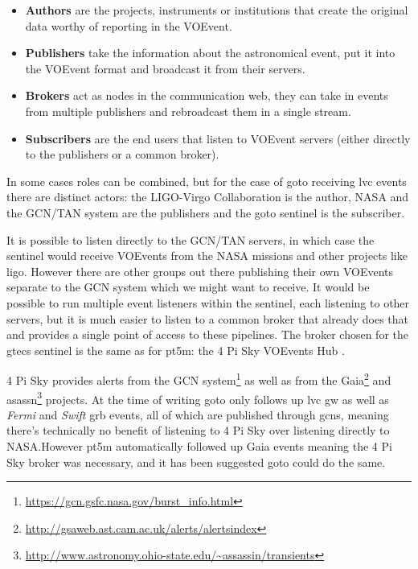 \begin{colsection}
\begin{colsection}
\begin{itemize}
    \item \textbf{Authors} are the projects, instruments or institutions that create the original data worthy of reporting in the VOEvent.
    \item \textbf{Publishers} take the information about the astronomical event, put it into the VOEvent format and broadcast it from their servers.
    \item \textbf{Brokers} act as nodes in the communication web, they can take in events from multiple publishers and rebroadcast them in a single stream.
    \item \textbf{Subscribers} are the end users that listen to VOEvent servers (either directly to the publishers or a common broker).
\end{itemize}

In some cases roles can be combined, but for the case of \gls{goto} receiving \gls{lvc} events there are distinct actors: the LIGO-Virgo Collaboration is the author, NASA and the GCN/TAN system are the publishers and the \gls{goto} sentinel is the subscriber.

It is possible to listen directly to the GCN/TAN servers, in which case the sentinel would receive VOEvents from the NASA missions and other projects like \gls{ligo}. However there are other groups out there publishing their own VOEvents separate to the GCN system which we might want to receive. It would be possible to run multiple event listeners within the sentinel, each listening to other servers, but it is much easier to listen to a common broker that already does that and provides a single point of access to these pipelines. The broker chosen for the \gls{gtecs} sentinel is the same as for pt5m: the 4 Pi Sky VOEvents Hub \citep{4pisky}.

4 Pi Sky provides alerts from the GCN system\footnote{\url{https://gcn.gsfc.nasa.gov/burst_info.html}} as well as from the Gaia\footnote{\url{http://gsaweb.ast.cam.ac.uk/alerts/alertsindex}} and \gls{asassn}\footnote{\url{http://www.astronomy.ohio-state.edu/~assassin/transients}} projects. At the time of writing \gls{goto} only follows up \gls{lvc} \gls{gw} as well as \textit{Fermi} and \textit{Swift} \gls{grb} events, all of which are published through \glspl{gcn}, meaning there's technically no benefit of listening to 4 Pi Sky over listening directly to NASA.\@ However pt5m automatically followed up Gaia events meaning the 4 Pi Sky broker was necessary, and it has been suggested \gls{goto} could do the same.


\end{colsection}
\end{colsection}
